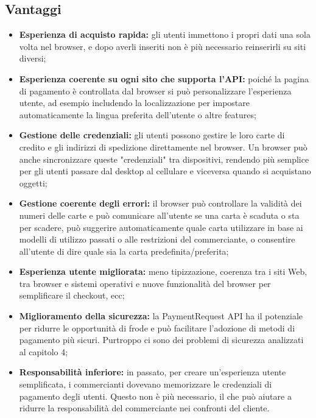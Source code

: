 \documentclass[italian]{article}
\begin{document}
	\subsection{Vantaggi}
	\begin{itemize}
	\item \textbf{Esperienza di acquisto rapida:} gli utenti immettono i propri dati una sola volta nel browser, e dopo averli inseriti non è più necessario reinserirli su siti diversi;
	\item \textbf{Esperienza coerente su ogni sito che supporta l'API:} poiché la pagina di pagamento è controllata dal browser si può personalizzare l'esperienza utente, ad esempio includendo la localizzazione per impostare automaticamente la lingua preferita dell'utente o altre features;
	\item \textbf{Gestione delle credenziali:} gli utenti possono gestire le loro carte di credito e gli indirizzi di spedizione direttamente nel browser. Un browser può anche sincronizzare queste "credenziali" tra dispositivi, rendendo più semplice per gli utenti passare dal desktop al cellulare e viceversa quando si acquistano oggetti;
	\item \textbf{Gestione coerente degli errori:} il browser può controllare la validità dei numeri delle carte e può comunicare all'utente se una carta è scaduta o sta per scadere, può suggerire automaticamente quale carta utilizzare in base ai modelli di utilizzo passati o alle restrizioni del commerciante, o consentire all'utente di dire quale sia la carta predefinita/preferita;
	\item \textbf{Esperienza utente migliorata:} meno tipizzazione, coerenza tra i siti Web, tra browser e sistemi operativi e nuove funzionalità del browser per semplificare il checkout, ecc;
	\item \textbf{Miglioramento della sicurezza:} la PaymentRequest API ha il potenziale per ridurre le opportunità di frode e può facilitare l'adozione di metodi di pagamento più sicuri. Purtroppo ci sono dei problemi di sicurezza analizzati al capitolo 4; 
	\item \textbf{Responsabilità inferiore:} in passato, per creare un'esperienza utente semplificata, i commercianti dovevano memorizzare le credenziali di pagamento degli utenti. Questo non è più necessario, il che può aiutare a ridurre la responsabilità del commerciante nei confronti del cliente.
	\end{itemize}
	
\end{document}
